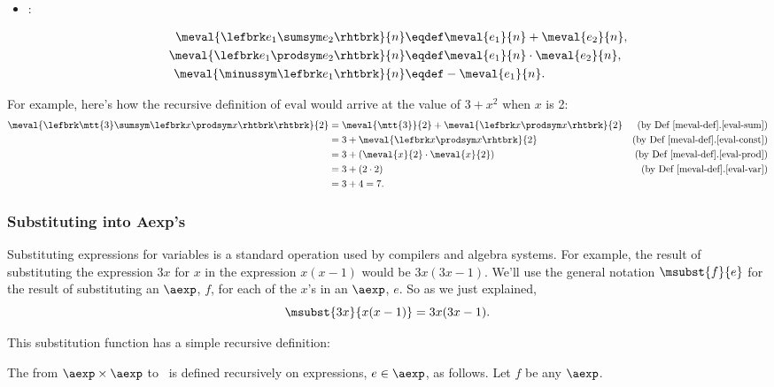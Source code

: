 \begin{definition}
\begin{definition}
\begin{itemize}
\item {}:

\begin{align}
\meval{\lefbrk e_1 \sumsym e_2 \rhtbrk}{n}
   & \eqdef \meval{e_1}{n}+\meval{e_2}{n},\label{eval-sum}\\
\meval{\lefbrk e_1 \prodsym e_2 \rhtbrk}{n}
  & \eqdef \meval{e_1}{n} \cdot \meval{e_2}{n}, \label{eval-prod}\\
\meval{\minussym\lefbrk e_1 \rhtbrk}{n} 
  &  \eqdef - \meval{e_1}{n}. \label{eval-minus}
\end{align}
\end{itemize}

\end{definition}

For example, here's how the recursive definition of $\text{eval}$
would arrive at the value of $3+x^2$ when $x$ is 2:
\begin{align*}
\meval{\lefbrk \mtt{3} \sumsym \lefbrk x \prodsym x\rhtbrk \rhtbrk}{2}
 & = \meval{\mtt{3}}{2} + \meval{\lefbrk x \prodsym x \rhtbrk}{2}
                  & \text{(by~Def~\ref{meval-def}.\ref{eval-sum})}\\
 & = 3 + \meval{\lefbrk x \prodsym x \rhtbrk}{2} & \text{(by~Def~\ref{meval-def}.\ref{eval-const})}\\
 & = 3 + (\meval{x}{2} \cdot \meval{x}{2}) & \text{(by~Def~\ref{meval-def}.\ref{eval-prod})}\\
 & = 3 + (2 \cdot 2) & \text{(by~Def~\ref{meval-def}.\ref{eval-var})}\\
 & = 3 + 4 = 7.
\end{align*}

\subsubsection{Substituting into Aexp's}
Substituting expressions for variables is a standard operation used by
compilers and algebra systems.  For example, the result of substituting
the expression $3x$ for $x$ in the expression $x(x-1)$ would be
$3x(3x-1)$.  We'll use the general notation $\msubst{f}{e}$ for the result
of substituting an $\aexp$, $f$, for each of the $x$'s in an $\aexp$, $e$.
So as we just explained,
\[
\msubst{3x}{x(x-1)} = 3x(3x-1).
\]

This substitution function has a simple recursive definition:

\begin{definition}\label{subst-def}
  The  from $\aexp \times \aexp$ to \aexp\ is
  defined recursively on expressions, $e \in \aexp$, as follows.  Let $f$
  be any $\aexp$.


\end{definition}
\end{definition}
